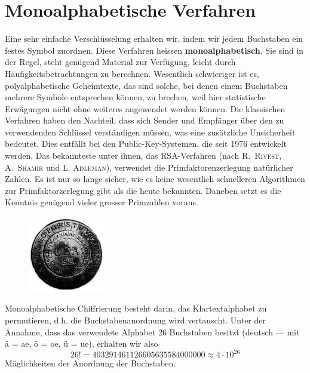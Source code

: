 \documentclass[%
11pt,%
twoside,%
titlepage,%
german,%
headsepline%
]{scrartcl}
\begin{document}
\section{Monoalphabetische Verfahren}

Eine sehr einfache Verschlüsselung erhalten wir, indem wir jedem Buchstaben ein festes Symbol zuordnen. Diese Verfahren heissen \textbf{monoalphabetisch}. Sie sind in der Regel, steht genügend Material zur Verfügung, leicht durch Häufigkeitsbetrachtungen zu berechnen. Wesentlich schwieriger ist es, polyalphabetische Geheimtexte, das sind solche, bei denen einem Buchstaben mehrere Symbole entsprechen k\"onnen, zu brechen, weil hier statistische Erwägungen nicht ohne weiteres angewendet werden k\"onnen. Die klassischen Verfahren haben den Nachteil, dass sich Sender und Empfänger über den zu verwendenden Schlüssel verständigen müssen, was eine zusätzliche Unsicherheit bedeutet. Dies entfällt bei den Public-Key-Systemen, die seit 1976 entwickelt werden. Das bekannteste unter ihnen, das RSA-Verfahren (nach \textsc{R.~Rivest, A.~Shamir} und \textsc{L. Adleman}), verwendet die Primfaktorenzerlegung natürlicher Zahlen. Es ist nur so lange sicher, wie es keine wesentlich schnelleren Algorithmen zur Primfaktorzerlegung gibt als die heute bekannten. Daneben setzt es die Kenntnis genügend vieler grosser Primzahlen voraus.

\begin{figure}
\vspace{-22pt}
  \begin{center}
    \includegraphics[width=0.3\textwidth]{pictures/Drehsch}
  \end{center}
\vspace{-22pt}
\end{figure}
Monoalphabetische Chiffrierung besteht darin, das Klartextalphabet zu permutieren, d.h. die Buchstabenanordnung wird vertauscht. Unter der Annahme, dass das verwendete Alphabet 26 Buchstaben besitzt (deutsch --- mit ä = ae, ö = oe, ü = ue), erhalten wir also
$$26! = 403291461126605635584000000 \approx 4\cdot10^{26}$$
Mäglichkeiten der Anordnung der Buchstaben.
\end{document}
